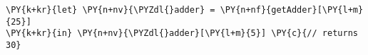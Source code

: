 \begin{Verbatim}[commandchars=\\\{\}]
\PY{k+kr}{let} \PY{n+nv}{\PYZdl{}adder} = \PY{n+nf}{getAdder}[\PY{l+m}{25}]
\PY{k+kr}{in} \PY{n+nv}{\PYZdl{}adder}[\PY{l+m}{5}] \PY{c}{// returns 30}
\end{Verbatim}
